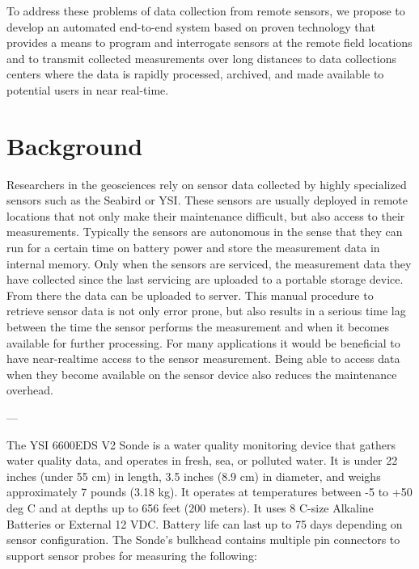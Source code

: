 \documentclass[conference]{IEEEtran}
\begin{document}
To address these problems of data collection from remote
sensors, we propose to develop an automated end-to-end system based on
proven technology that provides a means to program and interrogate
sensors at the remote field locations and to transmit collected
measurements over long distances to data collections centers where the
data is rapidly processed, archived, and made available to potential
users in near real-time.


\section{Background}

Researchers in the geosciences rely on sensor data collected by highly
specialized sensors such as the Seabird or YSI. These sensors are
usually deployed in remote locations that not only make their
maintenance difficult, but also access to their measurements.
Typically the sensors are autonomous in the sense that they can run
for a certain time on battery power and store the measurement data in
internal memory. Only when the sensors are serviced, the measurement
data they have collected since the last servicing are uploaded to a
portable storage device. From there the data can be uploaded to
server. This manual procedure to retrieve sensor data is not only
error prone, but also results in a serious time lag between the time
the sensor performs the measurement and when it becomes available for
further processing. For many applications it would be beneficial to
have near-realtime access to the sensor measurement. Being able to
access data when they become available on the sensor device also
reduces the maintenance overhead.

---

The YSI 6600EDS V2 Sonde is a water quality monitoring device that
gathers water quality data, and operates in fresh, sea, or
polluted water. It is under 22 inches (under 55 cm) in length, 3.5
inches (8.9 cm) in diameter, and weighs approximately 7 pounds (3.18
kg). It operates at temperatures between -5 to +50 deg C and at depths
up to 656 feet (200 meters).  It uses 8 C-size Alkaline Batteries or
External 12 VDC. Battery life can last up to 75 days depending on
sensor configuration. The Sonde's bulkhead contains multiple pin
connectors to support sensor probes for measuring the following:
\end{document}
